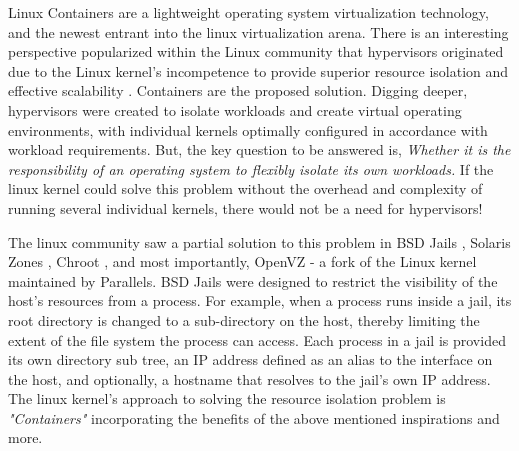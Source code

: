 




Linux Containers are a lightweight operating system virtualization technology, and the newest entrant into the linux virtualization arena. There is an interesting perspective popularized within the Linux community that hypervisors originated due to the Linux kernel's incompetence to provide superior resource isolation and effective scalability \cite{linux_incompetent}. Containers are the proposed solution. Digging deeper, hypervisors were created to isolate workloads and create virtual operating environments, with individual kernels optimally configured in accordance with workload requirements. But, the key question to be answered is,
\emph{Whether it is the responsibility of an operating system to flexibly isolate its own workloads.}
If the linux kernel could solve this problem without the overhead and complexity of running several individual kernels, there would not be a need for hypervisors!


The linux community saw a partial solution to this problem in BSD Jails \cite{jails}, Solaris Zones \cite{zones}, Chroot \cite{chroot}, and most importantly, OpenVZ \cite{openvz} - a fork of the Linux kernel maintained by Parallels. BSD Jails were designed to restrict the visibility of the host's resources from a process. For example, when a process runs inside a jail, its root directory is changed to a sub-directory on the host, thereby limiting the extent of the file system the process can access. Each process in a jail is provided its own directory sub tree, an IP address defined as an alias to the interface on the host, and optionally, a hostname that resolves to the jail's own IP address. The linux kernel's approach to solving the resource isolation problem is \emph{"Containers"} incorporating the benefits of the above mentioned inspirations and more. 


